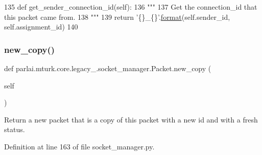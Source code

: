 \begin{DoxyCode}
135     \textcolor{keyword}{def }get\_sender\_connection\_id(self):
136         \textcolor{stringliteral}{"""}
137 \textcolor{stringliteral}{        Get the connection\_id that this packet came from.}
138 \textcolor{stringliteral}{        """}
139         \textcolor{keywordflow}{return} \textcolor{stringliteral}{'\{\}\_\{\}'}.\hyperlink{namespaceparlai_1_1chat__service_1_1services_1_1messenger_1_1shared__utils_a32e2e2022b824fbaf80c747160b52a76}{format}(self.sender\_id, self.assignment\_id)
140 
\end{DoxyCode}
\mbox{\label{classparlai_1_1mturk_1_1core_1_1legacy__2018_1_1socket__manager_1_1Packet_aabcd943398680a33c0a313da2ec1a767}} 
\subsubsection{\texorpdfstring{new\+\_\+copy()}{new\_copy()}}
{\footnotesize\ttfamily def parlai.\+mturk.\+core.\+legacy\+\_.\+socket\+\_\+manager.\+Packet.\+new\+\_\+copy (\begin{DoxyParamCaption}\item[{}]{self }\end{DoxyParamCaption})}

\begin{DoxyVerb}Return a new packet that is a copy of this packet with a new id and with a fresh
status.
\end{DoxyVerb}
 

Definition at line 163 of file socket\+\_\+manager.\+py.


